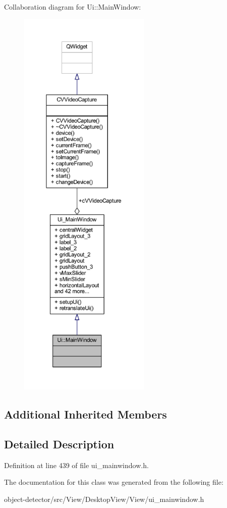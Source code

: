 Collaboration diagram for Ui\+:\+:Main\+Window\+:\nopagebreak
\begin{figure}[H]
\begin{center}
\leavevmode
\includegraphics[height=550pt]{dd/dc3/class_ui_1_1_main_window__coll__graph}
\end{center}
\end{figure}
\subsection*{Additional Inherited Members}


\subsection{Detailed Description}


Definition at line 439 of file ui\+\_\+mainwindow.\+h.



The documentation for this class was generated from the following file\+:\begin{DoxyCompactItemize}
\item 
object-\/detector/src/\+View/\+Desktop\+View/\+View/ui\+\_\+mainwindow.\+h\end{DoxyCompactItemize}
